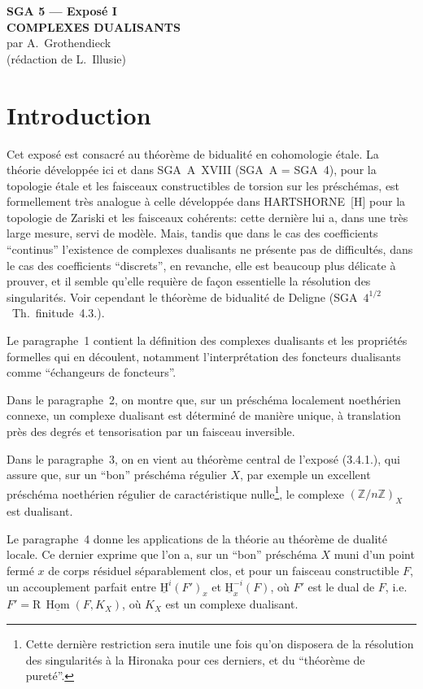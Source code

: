 \documentclass[11pt]{article}
\renewcommand{\H}{\mathrm{H}}
\DeclareMathOperator{\Hom}{Hom}
\newcommand{\R}{\mathrm{R}}
\newcommand{\Z}{\mathbb{Z}}
\providecommand{\Hom}{\operatorname{Hom}}
\providecommand{\R}{\mathrm R}
\providecommand{\Z}{\mathbb Z}
\providecommand{\Hom}{\operatorname{Hom}}
\begin{document}
\begin{center}
{\Large \textbf{SGA 5 --- Exposé I}}\\[0.4em]
{\large \textbf{COMPLEXES DUALISANTS}}\\[0.3em]
par A.~Grothendieck\\
(rédaction de L.~Illusie)
\end{center}

\section*{Introduction}

Cet exposé est consacré au théorème de bidualité en cohomologie étale. La théorie développée ici et dans SGA~A~XVIII (SGA~A = SGA~4), pour la topologie étale et les faisceaux constructibles de torsion sur les préschémas, est formellement très analogue à celle développée dans HARTSHORNE~[H] pour la topologie de Zariski et les faisceaux cohérents: cette dernière lui a, dans une très large mesure, servi de modèle. Mais, tandis que dans le cas des coefficients ``continus'' l'existence de complexes dualisants ne présente pas de difficultés, dans le cas des coefficients ``discrets'', en revanche, elle est beaucoup plus délicate à prouver, et il semble qu'elle requière de façon essentielle la résolution des singularités. Voir cependant le théorème de bidualité de Deligne (SGA~$4^{1/2}$~Th.~finitude~4.3.).

Le paragraphe~1 contient la définition des complexes dualisants et les propriétés formelles qui en découlent, notamment l'interprétation des foncteurs dualisants comme ``échangeurs de foncteurs''.

Dans le paragraphe~2, on montre que, sur un préschéma localement noethérien connexe, un complexe dualisant est déterminé de manière unique, à translation près des degrés et tensorisation par un faisceau inversible.

Dans le paragraphe~3, on en vient au théorème central de l'exposé (3.4.1.), qui assure que, sur un ``bon'' préschéma régulier $X$, par exemple un excellent préschéma noethérien régulier de caractéristique nulle\footnote{Cette dernière restriction sera inutile une fois qu'on disposera de la résolution des singularités à la Hironaka pour ces derniers, et du ``théorème de pureté''.}, le complexe $(\Z/n\Z)_X$ est dualisant.

Le paragraphe~4 donne les applications de la théorie au théorème de dualité locale. Ce dernier exprime que l'on a, sur un ``bon'' préschéma $X$ muni d'un point fermé $x$ de corps résiduel séparablement clos, et pour un faisceau constructible $F$, un accouplement parfait entre $\underline{\H}^i(F')_x$ et $\underline{\H}^{-i}_x(F)$, où $F'$ est le dual de $F$, i.e.\ $F' = \R\,\underline{\Hom}(F,K_X)$, où $K_X$ est un complexe dualisant.
\end{document}
